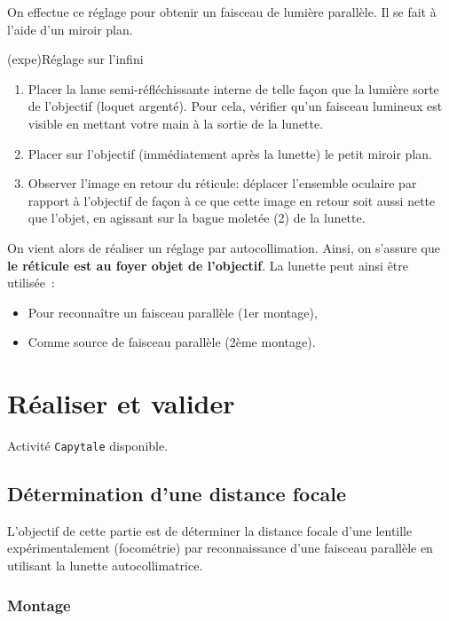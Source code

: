 \documentclass[../main/main.tex]{subfiles}
\begin{document}
On effectue ce réglage pour obtenir un faisceau de lumière parallèle. Il se fait
à l'aide d'un miroir plan.

\begin{tcb}(expe){Réglage sur l'infini}
	\begin{enumerate}
		\item Placer la lame semi-réfléchissante interne de telle façon que la
		      lumière sorte de l'objectif (loquet argenté). Pour cela, vérifier qu'un
		      faisceau lumineux est visible en mettant votre main à la sortie de la
		      lunette.
		\item Placer sur l'objectif (immédiatement après la lunette) le petit miroir
		      plan.
		\item Observer l'image en retour du réticule: déplacer l'ensemble oculaire
		      par rapport à l'objectif de façon à ce que cette image en retour soit
		      aussi nette que l'objet, en agissant sur la bague moletée (2) de la
		      lunette.
	\end{enumerate}
\end{tcb}

On vient alors de réaliser un réglage par autocollimation. Ainsi, on s'assure
que \textbf{le réticule est au foyer objet de l'objectif}. La lunette peut ainsi
être utilisée~:
\begin{itemize}
	\item Pour reconnaître un faisceau parallèle (1er montage),
	\item Comme source de faisceau parallèle (2ème montage).
\end{itemize}

\section{Réaliser et valider}

Activité \texttt{Capytale}
disponible.

\subsection{Détermination d'une distance focale}

L'objectif de cette partie est de déterminer la distance focale d'une lentille
expérimentalement (focométrie) par reconnaissance d'une faisceau parallèle en
utilisant la lunette autocollimatrice.

\subsubsection{Montage}
\end{document}
